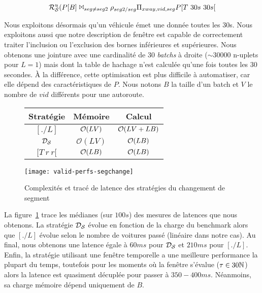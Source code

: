 $$\mathcal{R}_{\mathcal S}^{u}(P[B] \Join_{seg\neq seg2} \rho_{seg2/seg} \Pi_{xway,vid,seg} P[T\ 30s\ 30s[$$

Nous exploitons désormais qu'un véhicule émet une donnée toutes les 30s. Nous exploitons aussi que notre description de fenêtre est capable de correctement traiter l'inclusion ou l'exclusion des bornes inférieures et supérieures. Nous obtenons une jointure avec une cardinalité de 30 \textit{batchs} à droite ($\sim$30000 n-uplets pour $L=1$) mais dont la table de hachage n'est calculée qu'une fois toutes les 30 secondes. À la différence, cette optimisation est plus difficile à automatiser, car elle dépend des caractéristiques de $P$. Nous notons $B$ la taille d'un batch et $V$ le nombre de $vid$ différents pour une autoroute.


\begin{figure}[ht]
\centering
\begin{minipage}{0.44\textwidth}
\begin{tabular}{|c|c|c|}\bottomrule
\rowcolor{hypcolor} Stratégie & Mémoire & Calcul \\ \hline
$[./L]$ & $\mathcal{O}(LV)$ & $\mathcal{O}(LV+LB)$ \\\hline
$\mathcal{D_S}$ & $\mathcal O(LV)$ & $\mathcal{O}(LB)$  \\\hline
$[T\ r\ r[$ & $\mathcal{O}(LB)$ & $\mathcal{O}(LB)$\\ \toprule
\end{tabular}
\end{minipage}
\begin{minipage}{0.55\textwidth}
\texttt{[image: valid-perfs-segchange]}
\end{minipage}
\caption{Complexités et tracé de latence des stratégies du changement de segment}\label{fig:valid:perfs:segchange}
\end{figure}

La figure~\ref{fig:valid:perfs:segchange} trace les médianes (sur $100s$) des mesures de latences que nous obtenons. La stratégie $\mathcal{D_S}$ évolue en fonction de la charge du benchmark alors que $[./L]$ évolue selon le nombre de voitures passé (linéaire dans notre cas). Au final, nous obtenons une latence égale à $60ms$ pour $\mathcal{D_S}$ et $210ms$ pour $[./L]$. Enfin, la stratégie utilisant une fenêtre temporelle a une meilleure performance la plupart du temps, toutefois pour les moments où la fenêtre s'évalue ($\tau\in 30\mathbb{N}$) alors la latence est quasiment décuplée pour passer à $350-400ms$. Néanmoins, sa charge mémoire dépend uniquement de $B$.

